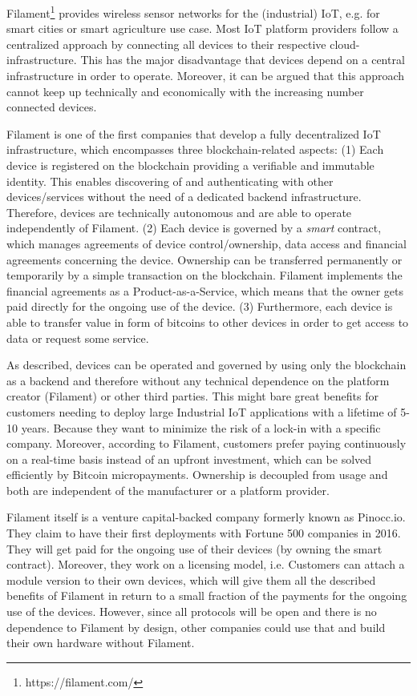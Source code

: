 {Filament\footnote{https://filament.com/} provides wireless sensor networks for the (industrial) IoT, e.g. 
for smart cities or smart agriculture use case. Most IoT platform providers follow 
a centralized approach by connecting all devices to their respective cloud-infrastructure. 
This has the major disadvantage that devices depend on a central infrastructure 
in order to operate. Moreover, it can be argued that this approach cannot keep 
up technically and economically with the increasing number connected devices.

Filament is one of the first companies that develop a fully decentralized IoT infrastructure, 
which encompasses three blockchain-related aspects: (1) Each device is registered 
on the blockchain providing a verifiable and immutable identity. This enables discovering 
of and authenticating with other devices/services without the need of a dedicated 
backend infrastructure. Therefore, devices are technically autonomous and are able 
to operate independently of Filament. (2) Each device is governed by a \emph{smart} 
contract, which manages agreements of device control/ownership, data access and 
financial agreements concerning the device. Ownership can be transferred permanently 
or temporarily by a simple transaction on the blockchain. Filament implements the 
financial agreements as a Product-as-a-Service, which means that the owner gets 
paid directly for the ongoing use of the device. (3) Furthermore, each device is 
able to transfer value in form of bitcoins to other devices in order to get access 
to data or request some service.

As described, devices can be operated and governed by using only the blockchain 
as a backend and therefore without any technical dependence on the platform creator 
(Filament) or other third parties. This might bare great benefits for customers 
needing to deploy large Industrial IoT applications with a lifetime of 5-10 years. 
Because they want to minimize the risk of a lock-in with a specific company. Moreover, 
according to Filament, customers prefer paying continuously on a real-time basis 
instead of an upfront investment, which can be solved efficiently by Bitcoin micropayments. 
Ownership is decoupled from usage and both are independent of the manufacturer 
or a platform provider.

Filament itself is a venture capital-backed company formerly known as Pinocc.io. 
They claim to have their first deployments with Fortune 500 companies in 2016. 
They will get paid for the ongoing use of their devices (by owning the smart contract). 
Moreover, they work on a licensing model, i.e. Customers can attach a module version 
to their own devices, which will give them all the described benefits of Filament 
in return to a small fraction of the payments for the ongoing use of the devices. 
However, since all protocols will be open and there is no dependence to Filament 
by design, other companies could use that and build their own hardware without 
Filament.

}
